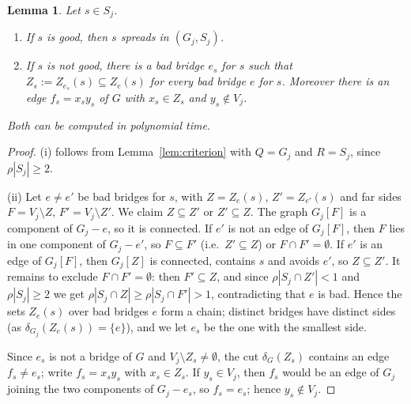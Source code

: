 \documentclass[11pt,letterpaper]{article}
\newtheorem{lemma}[theorem]{Lemma}
\theoremstyle{definition}
\begin{document}
\begin{lemma}\label{lem:bad}
Let $s\in S_j$.
\begin{enumerate}[label=(\roman*),nosep]
\item If $s$ is good, then $s$ spreads in $(G_j,S_j)$.
\item If $s$ is not good, there is a bad bridge $e_s$ for $s$ such that
$Z_s:=Z_{e_s}(s)\subseteq Z_e(s)$ for every bad bridge $e$ for $s$. Moreover there is an edge
$f_s=x_sy_s$ of $G$ with $x_s\in Z_s$ and $y_s\notin V_j$.
\end{enumerate}
Both can be computed in polynomial time.
\end{lemma}
\begin{proof}
(i) follows from Lemma~\ref{lem:criterion} with $Q=G_j$ and $R=S_j$, since
$\rho|S_j|\ge2$.

(ii) Let $e\ne e'$ be bad bridges for $s$, with $Z=Z_e(s)$, $Z'=Z_{e'}(s)$ and far sides
$F=V_j\setminus Z$, $F'=V_j\setminus Z'$. We claim $Z\subseteq Z'$ or $Z'\subseteq Z$. The
graph $G_j[F]$ is a component of $G_j-e$, so it is connected. If $e'$ is not an edge of
$G_j[F]$, then $F$ lies in one component of $G_j-e'$, so $F\subseteq F'$ (i.e.\ $Z'\subseteq Z$)
or $F\cap F'=\emptyset$. If $e'$ is an edge of $G_j[F]$, then $G_j[Z]$ is connected, contains
$s$ and avoids $e'$, so $Z\subseteq Z'$. It remains to exclude $F\cap F'=\emptyset$: then
$F'\subseteq Z$, and since $\rho|S_j\cap Z'|<1$ and $\rho|S_j|\ge2$ we get
$\rho|S_j\cap Z|\ge\rho|S_j\cap F'|>1$, contradicting that $e$ is bad. Hence the sets $Z_e(s)$
over bad bridges $e$ form a chain; distinct bridges have distinct sides (as
$\delta_{G_j}(Z_e(s))=\{e\}$), and we let $e_s$ be the one with the smallest side.

Since $e_s$ is not a bridge of $G$ and $V_j\setminus Z_s\neq\emptyset$, the cut
$\delta_G(Z_s)$ contains an edge $f_s\ne e_s$; write $f_s=x_sy_s$ with $x_s\in Z_s$. If
$y_s\in V_j$, then $f_s$ would be an edge of $G_j$ joining the two components of $G_j-e_s$, so
$f_s=e_s$; hence $y_s\notin V_j$.
\end{proof}
\end{document}
